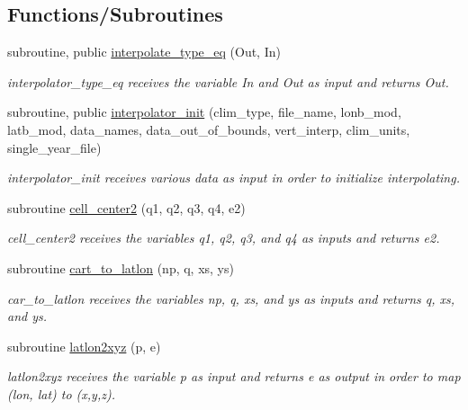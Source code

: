 \subsection*{Functions/\+Subroutines}
\begin{DoxyCompactItemize}
\item 
subroutine, public \hyperlink{namespaceinterpolator__mod_a19abcf7938596e9a635bb58a0fe48deb}{interpolate\+\_\+type\+\_\+eq} (Out, In)
\begin{DoxyCompactList}\small\item\em interpolator\+\_\+type\+\_\+eq receives the variable In and Out as input and returns Out. \end{DoxyCompactList}\item 
subroutine, public \hyperlink{namespaceinterpolator__mod_a8613c8850b935b6b95be55b6c250d64a}{interpolator\+\_\+init} (clim\+\_\+type, file\+\_\+name, lonb\+\_\+mod, latb\+\_\+mod, data\+\_\+names, data\+\_\+out\+\_\+of\+\_\+bounds, vert\+\_\+interp, clim\+\_\+units, single\+\_\+year\+\_\+file)
\begin{DoxyCompactList}\small\item\em interpolator\+\_\+init receives various data as input in order to initialize interpolating. \end{DoxyCompactList}\item 
subroutine \hyperlink{namespaceinterpolator__mod_a444568a0a574084630d91b8da59f3bc5}{cell\+\_\+center2} (q1, q2, q3, q4, e2)
\begin{DoxyCompactList}\small\item\em cell\+\_\+center2 receives the variables q1, q2, q3, and q4 as inputs and returns e2. \end{DoxyCompactList}\item 
subroutine \hyperlink{namespaceinterpolator__mod_a6d7828eb74252f340328684ae223f785}{cart\+\_\+to\+\_\+latlon} (np, q, xs, ys)
\begin{DoxyCompactList}\small\item\em car\+\_\+to\+\_\+latlon receives the variables np, q, xs, and ys as inputs and returns q, xs, and ys. \end{DoxyCompactList}\item 
subroutine \hyperlink{namespaceinterpolator__mod_af262b3bf80a5aa9610024f74c8958c01}{latlon2xyz} (p, e)
\begin{DoxyCompactList}\small\item\em latlon2xyz receives the variable p as input and returns e as output in order to map (lon, lat) to (x,y,z). \end{DoxyCompactList}\item 

\end{DoxyCompactItemize}
